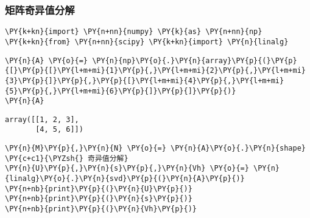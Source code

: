     \hypertarget{ux77e9ux9635ux5947ux5f02ux503cux5206ux89e3}{%
\subsubsection{矩阵奇异值分解}\label{ux77e9ux9635ux5947ux5f02ux503cux5206ux89e3}}

    \begin{tcolorbox}[breakable, size=fbox, boxrule=1pt, pad at break*=1mm,colback=cellbackground, colframe=cellborder]
\begin{Verbatim}[commandchars=\\\{\}]
\PY{k+kn}{import} \PY{n+nn}{numpy} \PY{k}{as} \PY{n+nn}{np}
\PY{k+kn}{from} \PY{n+nn}{scipy} \PY{k+kn}{import} \PY{n}{linalg}
\end{Verbatim}
\end{tcolorbox}

    \begin{tcolorbox}[breakable, size=fbox, boxrule=1pt, pad at break*=1mm,colback=cellbackground, colframe=cellborder]
\begin{Verbatim}[commandchars=\\\{\}]
\PY{n}{A} \PY{o}{=} \PY{n}{np}\PY{o}{.}\PY{n}{array}\PY{p}{(}\PY{p}{[}\PY{p}{[}\PY{l+m+mi}{1}\PY{p}{,}\PY{l+m+mi}{2}\PY{p}{,}\PY{l+m+mi}{3}\PY{p}{]}\PY{p}{,}\PY{p}{[}\PY{l+m+mi}{4}\PY{p}{,}\PY{l+m+mi}{5}\PY{p}{,}\PY{l+m+mi}{6}\PY{p}{]}\PY{p}{]}\PY{p}{)}
\PY{n}{A}
\end{Verbatim}
\end{tcolorbox}

            \begin{tcolorbox}[breakable, size=fbox, boxrule=.5pt, pad at break*=1mm, opacityfill=0]
\begin{Verbatim}[commandchars=\\\{\}]
array([[1, 2, 3],
       [4, 5, 6]])
\end{Verbatim}
\end{tcolorbox}
        
    \begin{tcolorbox}[breakable, size=fbox, boxrule=1pt, pad at break*=1mm,colback=cellbackground, colframe=cellborder]
\begin{Verbatim}[commandchars=\\\{\}]
\PY{n}{M}\PY{p}{,}\PY{n}{N} \PY{o}{=} \PY{n}{A}\PY{o}{.}\PY{n}{shape}
\PY{c+c1}{\PYZsh{} 奇异值分解}
\PY{n}{U}\PY{p}{,}\PY{n}{s}\PY{p}{,}\PY{n}{Vh} \PY{o}{=} \PY{n}{linalg}\PY{o}{.}\PY{n}{svd}\PY{p}{(}\PY{n}{A}\PY{p}{)}
\PY{n+nb}{print}\PY{p}{(}\PY{n}{U}\PY{p}{)}
\PY{n+nb}{print}\PY{p}{(}\PY{n}{s}\PY{p}{)}
\PY{n+nb}{print}\PY{p}{(}\PY{n}{Vh}\PY{p}{)}
\end{Verbatim}
\end{tcolorbox}

